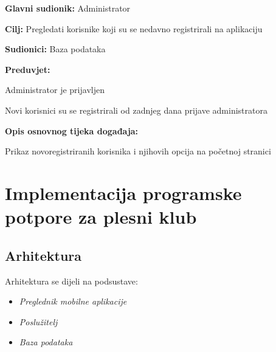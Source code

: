 \documentclass[times, utf8, zavrsni]{fer}
\newenvironment{packed_enum}{
	\begin{enumerate}
		\setlength{\itemsep}{0pt}
		\setlength{\parskip}{0pt}
		\setlength{\parsep}{0pt}
	}{\end{enumerate}}
\newenvironment{packed_item}{
	\begin{itemize}
		\setlength{\itemsep}{0pt}
		\setlength{\parskip}{0pt}
		\setlength{\parsep}{0pt}
	}{\end{itemize}}
\begin{document}
		    \noindent {}
					\begin{packed_item}
						
						\item \textbf{Glavni sudionik: } Administrator
						\item  \textbf{Cilj:} Pregledati korisnike koji su se nedavno registrirali na aplikaciju
						\item  \textbf{Sudionici:} Baza podataka
						\item  \textbf{Preduvjet:} 
						
						\item[] \begin{packed_enum}
							
							\item Administrator je prijavljen
							\item Novi korisnici su se registrirali od zadnjeg dana prijave administratora
							
							
						\end{packed_enum}
						\item  \textbf{Opis osnovnog tijeka događaja:}
						
						\item[] \begin{packed_enum}
							
							\item Prikaz novoregistriranih korisnika i njihovih opcija na početnoj stranici
							
							
						\end{packed_enum}
						
					\end{packed_item}

\chapter{Implementacija programske potpore za plesni klub}
    \section{Arhitektura}
        \noindent Arhitektura se dijeli na podsustave:
    	\begin{itemize}
    		\item 	\textit{Preglednik mobilne aplikacije}
    		\item 	\textit{Poslužitelj}
    		\item 	\textit{Baza podataka}		
    	\end{itemize}
    	
\end{document}
